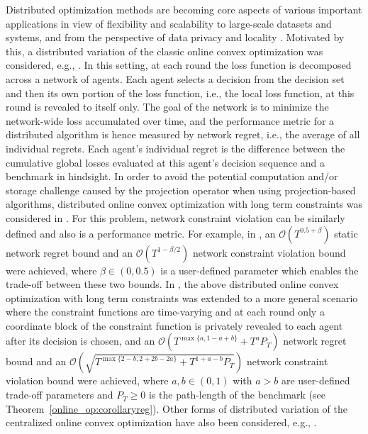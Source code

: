 \documentclass[12pt,draftcls,onecolumn]{IEEEtran}%
\begin{document}
Distributed optimization methods are becoming core aspects of various important applications in view of flexibility and scalability to large-scale datasets and systems, and from the perspective of data privacy and locality \cite{pmlr-v97-koloskova19a}. Motivated by this, a distributed variation of the classic online convex optimization was considered, e.g., \cite{tsianos2012distributed,
	mateos2014distributed,koppel2015saddle,hosseini2016online,
	akbari2017distributed,shahrampour2018distributed,akbari2018individual,zhang2019distributed,
	wan2020projection,carnevale2020distributed}.
In this setting, at each round the loss function is decomposed across a network of agents. Each agent selects a decision from  the decision set and then its own portion of the loss function, i.e., the local loss function, at this round is revealed to itself only. The goal of the network is to minimize the network-wide loss accumulated over time, and the performance metric for a distributed algorithm is hence measured by network regret, i.e., the average of all individual regrets. Each agent's individual regret is the difference between the cumulative global losses evaluated at this agent's decision sequence and a benchmark in hindsight. In order to avoid the potential computation and/or storage challenge caused by the projection operator when using projection-based algorithms, distributed online convex optimization with long term constraints was considered in \cite{yuan2017adaptive,yuan2021distributed,yuan2021distributedb}. For this problem, network constraint violation can be similarly defined and also is a performance metric. For example, in \cite{yuan2017adaptive}, an $\mathcal{O}(T^{0.5+\beta})$ static network regret bound and an $\mathcal{O}(T^{1-\beta/2})$ network constraint violation bound were achieved, where $\beta\in(0,0.5)$ is a user-defined parameter which enables the trade-off between these two bounds. 
In \cite{sharma2020distributed}, the above distributed online convex optimization with long term constraints was extended to a more general scenario where the constraint functions are time-varying and at each round only a coordinate block of the constraint function is privately revealed to each agent after its decision is chosen, and an $\mathcal{O}(T^{\max\{a,1-a+b\}}+T^aP_T)$ network regret bound and an $\mathcal{O}(\sqrt{T^{\max\{2-b,2+2b-2a\}}+T^{1+a-b}P_T})$ network constraint violation bound were achieved, where $a,b\in(0,1)$ with $a>b$ are user-defined trade-off parameters and $P_T\ge0$ is the path-length of the benchmark (see Theorem~\ref{online_op:corollaryreg}).
Other forms of distributed variation of the centralized online convex optimization have also been considered, e.g., \cite{raginsky2011decentralized,lee2016coordinate,lee2017stochastic,
	Li2018distributed,yi2020distributed,yi2019distributed,li2020distributed}.
\end{document}
